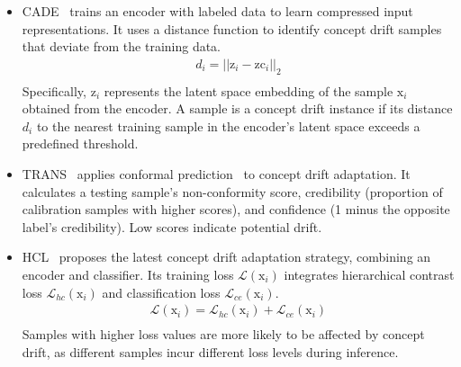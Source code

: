 \begin{itemize}[leftmargin=0.35cm]

\item CADE~\cite{2021-Usenix-CDAE} trains an encoder with labeled data to learn compressed input representations. 
It uses a distance function to identify concept drift samples that deviate from the training data.
\begin{equation}
	\begin{aligned}
		d_{i} = ||\bm{\mathrm{z}}_{i}-\bm{\mathrm{zc}}_{i}||_{2} \\
	\end{aligned}
	\label{CADE}
\end{equation}
Specifically, $\bm{\mathrm{z}}_{i}$ represents the latent space embedding of the sample $\bm{\mathrm{x}}_{i}$ obtained from the encoder. 
A sample is a concept drift instance if its distance $d_{i}$ to the nearest training sample in the encoder’s latent space exceeds a predefined threshold.
\item TRANS~\cite{2022-SP-Trancending}
applies conformal prediction~\cite{2005-high-cite-Algorithmic-learning-in-a-random-world} to concept drift adaptation.
It calculates a testing sample’s non-conformity score, credibility (proportion of calibration samples with higher scores), and confidence (1 minus the opposite label’s credibility). 
Low scores indicate potential drift.
\item HCL~\cite{2023-Usenix-chenyizhen}
proposes the latest concept drift adaptation strategy, combining an encoder and classifier. 
Its training loss $\mathcal{L}(\bm{\mathrm{x}}_{i})$ integrates hierarchical contrast loss $\mathcal{L}_{hc}(\bm{\mathrm{x}}_{i})$ and classification loss $\mathcal{L}_{ce}(\bm{\mathrm{x}}_{i})$.
\begin{equation}
	\begin{aligned}
		\mathcal{L}(\bm{\mathrm{x}}_{i}) = \mathcal{L}_{hc}(\bm{\mathrm{x}}_{i}) + \mathcal{L}_{ce}(\bm{\mathrm{x}}_{i}) \\
	\end{aligned}
	\label{CADE}
\end{equation}
Samples with higher loss values are more likely to be affected by concept drift, as different samples incur different loss levels during inference.

\end{itemize}
